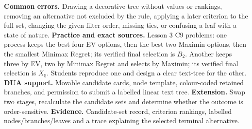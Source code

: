 \documentclass[10pt,letterpaper]{article}
\begin{document}
\begin{bluebox}
		\textbf{Common errors.} Drawing a decorative tree without values or rankings,
		removing an alternative not excluded by the rule, applying a later criterion
		to the full set, changing the given filter order, missing ties, or confusing a
		leaf with a state of nature. \textbf{Practice and exact sources.} Lesson 3 C9
		problems: one process keeps the best four EV options, then the best two Maximin
		options, then the smallest Minimax Regret; its verified final selection is
		$B_2$. Another keeps three by EV, two by Minimax Regret and selects by Maximin;
		its verified final selection is $X_5$. Students reproduce one and design a
		clear text-tree for the other. \textbf{DUA support.} Movable candidate cards,
		node template, colour-coded retained branches, and permission to submit a
		labelled linear text tree. \textbf{Extension.} Swap two stages, recalculate the
		candidate sets and determine whether the outcome is order-sensitive.
		\textbf{Evidence.} Candidate-set record, criterion rankings, labelled
		nodes/branches/leaves and a trace explaining the selected terminal alternative.
		

\end{bluebox}
\end{document}
